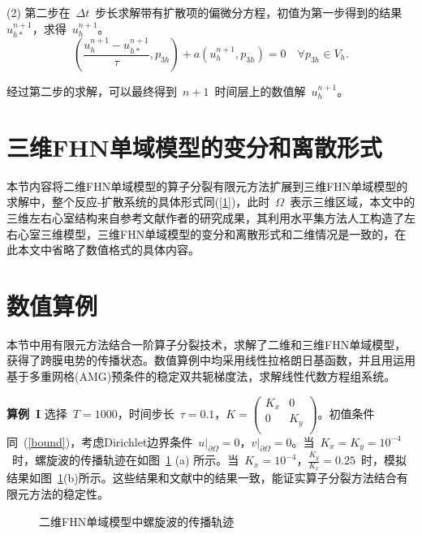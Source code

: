 \documentclass[twoside,UTF8]{nputhesis}
\begin{document}
(2) 第二步在~$\Delta t$~步长求解带有扩散项的偏微分方程，初值为第一步得到的结果~$u^{n+1}_{h*}$，求得~$u^{n+1}_{h}$。
\begin{equation}
(\frac{u^{n+1}_{h}-u^{n+1}_{h*}}{\tau},p_{3h})+a(u^{n+1}_{h},p_{3h})=0\quad \forall p_{3h}\in V_h.
\label{94}
\end{equation}

经过第二步的求解，可以最终得到~$n+1$~时间层上的数值解~$u^{n+1}_h$。
\section{三维FHN单域模型的变分和离散形式}
本节内容将二维FHN单域模型的算子分裂有限元方法扩展到三维FHN单域模型的求解中，整个反应-扩散系统的具体形式同(\ref{1})，此时~$\Omega$~表示三维区域，本文中的三维左右心室结构来自参考文献\cite{Ying2005}作者的研究成果，其利用水平集方法人工构造了左右心室三维模型，三维FHN单域模型的变分和离散形式和二维情况是一致的，在此本文中省略了数值格式的具体内容。

\section{数值算例}
本节中用有限元方法结合一阶算子分裂技术，求解了二维和三维FHN单域模型，获得了跨膜电势的传播状态。数值算例中均采用线性拉格朗日基函数，并且用运用基于多重网格(AMG)预条件的稳定双共轭梯度法，求解线性代数方程组系统。

\textbf{算例~I} 选择~$T=1000$，时间步长~$\tau=0.1$，$K=\left(\begin{array}{cc}K_x & 0 \\0 & K_y \\ \end{array}\right)$。初值条件同~(\ref{bound})，考虑Dirichlet边界条件~$u|_{\partial\Omega}=0$，$ v|_{\partial\Omega}=0$。当~$K_x=K_y=10^{-4}$~时，螺旋波的传播轨迹在如图~\ref{fig4} (a) 所示。当~$K_x=10^{-4}$，$\frac{K_y}{K_x}=0.25$~时，模拟结果如图~\ref{fig4}(b)所示。这些结果和文献\cite{fw2012}中的结果一致，能证实算子分裂方法结合有限元方法的稳定性。
\begin{figure}[htb]
	\centering
	{	
		}
	\hspace{0.2\textwidth}
	\caption{二维FHN单域模型中螺旋波的传播轨迹}
	\label{fig4}
\end{figure}
\end{document}
